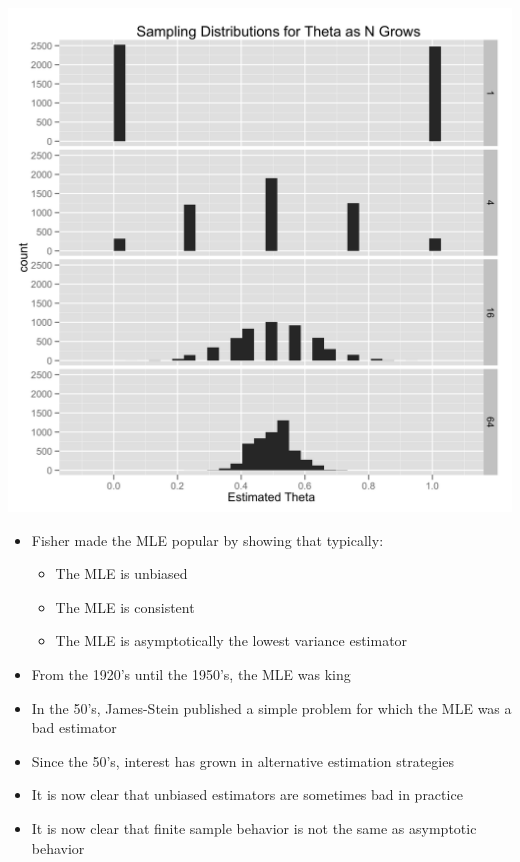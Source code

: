 \documentclass{beamer}
\begin{document}
\frame
{
  \begin{center}
    \includegraphics[scale = 0.1]{sampling_distribution.png}
  \end{center}
}

\frame
{
  \begin{itemize}
    \item{Fisher made the MLE popular by showing that typically:}
    \begin{itemize}
      \item{The MLE is unbiased}
      \item{The MLE is consistent}
      \item{The MLE is asymptotically the lowest variance estimator}
    \end{itemize}
  \end{itemize}
}

\frame
{
  \begin{itemize}
    \item{From the 1920's until the 1950's, the MLE was king}
    \item{In the 50's, James-Stein published a simple problem for which the MLE was a bad estimator}
  \end{itemize}
}

\frame
{
  \begin{itemize}
    \item{Since the 50's, interest has grown in alternative estimation strategies }
    \item{It is now clear that unbiased estimators are sometimes bad in practice}
    \item{It is now clear that finite sample behavior is not the same as asymptotic behavior}
  \end{itemize}
}
\end{document}
